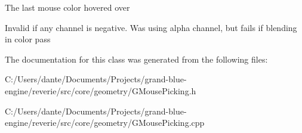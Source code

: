 The last mouse color hovered over

Invalid if any channel is negative. Was using alpha channel, but fails if blending in color pass 

The documentation for this class was generated from the following files\+:\begin{DoxyCompactItemize}
\item 
C\+:/\+Users/dante/\+Documents/\+Projects/grand-\/blue-\/engine/reverie/src/core/geometry/G\+Mouse\+Picking.\+h\item 
C\+:/\+Users/dante/\+Documents/\+Projects/grand-\/blue-\/engine/reverie/src/core/geometry/G\+Mouse\+Picking.\+cpp\end{DoxyCompactItemize}
